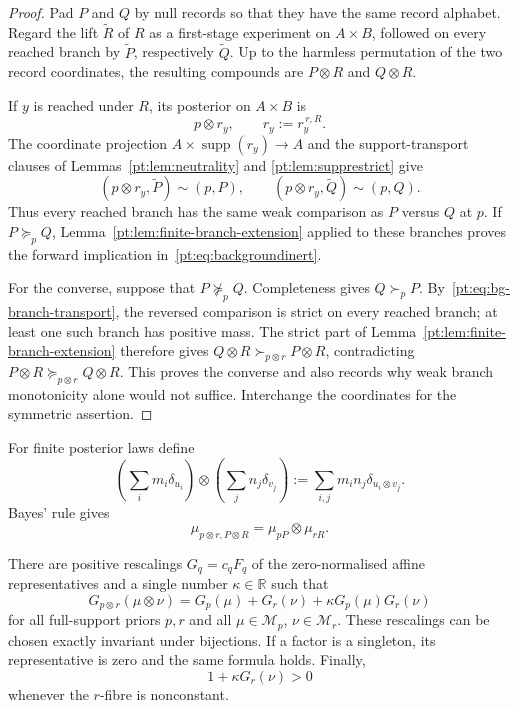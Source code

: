 \begin{proof}
Pad $P$ and $Q$ by null records so that they have the same record alphabet.
Regard the lift $\widetilde R$ of $R$ as a first-stage experiment on
$A\times B$, followed on every reached branch by $\widetilde P$, respectively
$\widetilde Q$.  Up to the harmless permutation of the two record
coordinates, the resulting compounds are $P\otimes R$ and $Q\otimes R$.

If $y$ is reached under $R$, its posterior on $A\times B$ is
\[
 p\otimes r_y,
 \qquad r_y:=r_y^{\,r,R}.
\]
The coordinate projection $A\times\operatorname{supp}(r_y)\to A$ and the
support-transport clauses of Lemmas~\ref{pt:lem:neutrality} and
\ref{pt:lem:supprestrict} give
\[
 (p\otimes r_y,\widetilde P)\sim(p,P),
 \qquad
 (p\otimes r_y,\widetilde Q)\sim(p,Q).
\tag{BI$'$}\label{pt:eq:bg-branch-transport}
\]
Thus every reached branch has the same weak comparison as $P$ versus $Q$ at
$p$.  If $P\succeq_pQ$, Lemma~\ref{pt:lem:finite-branch-extension} applied to
these branches proves the forward implication in~\eqref{pt:eq:backgroundinert}.

For the converse, suppose that $P\not\succeq_pQ$.  Completeness gives
$Q\succ_pP$.  By~\eqref{pt:eq:bg-branch-transport}, the reversed comparison is
strict on every reached branch; at least one such branch has positive mass.
The strict part of Lemma~\ref{pt:lem:finite-branch-extension} therefore gives
$Q\otimes R\succ_{p\otimes r}P\otimes R$, contradicting
$P\otimes R\succeq_{p\otimes r}Q\otimes R$.  This proves the converse and
also records why weak branch monotonicity alone would not suffice.  Interchange
the coordinates for the symmetric assertion.
\end{proof}

For finite posterior laws define
\[
 \left(\sum_i m_i\delta_{u_i}\right)\otimes
 \left(\sum_j n_j\delta_{v_j}\right)
 :=\sum_{i,j}m_i n_j\delta_{u_i\otimes v_j}.
\]
Bayes' rule gives
\begin{equation}
 \mu_{p\otimes r,P\otimes R}=\mu_{pP}\otimes\mu_{rR}.
\tag{PL}\label{pt:eq:productlaw}
\end{equation}

\begin{lemma}
\label{pt:lem:coherentnorm}
There are positive rescalings $G_q=c_qF_q$ of the zero-normalised affine
representatives and a single number $\kappa\in\mathbb R$ such that
\begin{equation}
 G_{p\otimes r}(\mu\otimes\nu)
 =G_p(\mu)+G_r(\nu)+\kappa G_p(\mu)G_r(\nu)
\tag{QA}\label{pt:eq:QA}
\end{equation}
for all full-support priors $p,r$ and all
$\mu\in\mathcal M_p$, $\nu\in\mathcal M_r$.  These rescalings can be chosen
exactly invariant under bijections.  If a factor is a singleton, its
representative is zero and the same formula holds.  Finally,
\begin{equation}
 1+\kappa G_r(\nu)>0
\tag{POS}\label{pt:eq:QAslope}
\end{equation}
whenever the $r$-fibre is nonconstant.
\end{lemma}

